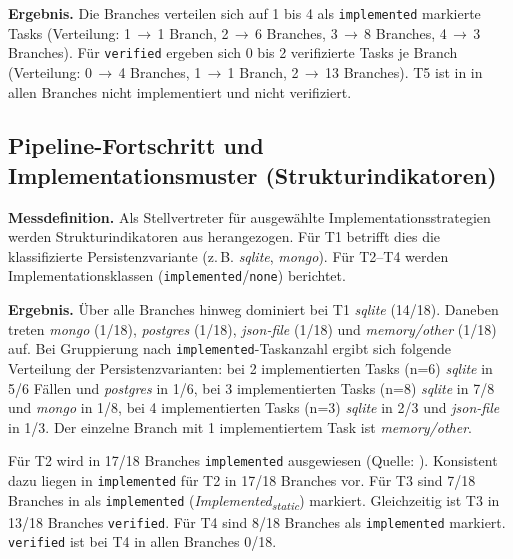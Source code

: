 {\bfseries Ergebnis.} Die Branches verteilen sich auf 1 bis 4 als \texttt{implemented} markierte Tasks (Verteilung: 1\,$\rightarrow$\,1 Branch, 2\,$\rightarrow$\,6 Branches, 3\,$\rightarrow$\,8 Branches, 4\,$\rightarrow$\,3 Branches).
Für \texttt{verified} ergeben sich 0 bis 2 verifizierte Tasks je Branch (Verteilung: 0\,$\rightarrow$\,4 Branches, 1\,$\rightarrow$\,1 Branch, 2\,$\rightarrow$\,13 Branches).
T5 ist in  in allen Branches nicht implementiert und nicht verifiziert.

\subsection{Pipeline-Fortschritt und Implementationsmuster (Strukturindikatoren)}
\label{sec:results_triangulation_strategies}

\begin{sloppypar}
{\bfseries Messdefinition.} Als Stellvertreter für ausgewählte Implementationsstrategien werden Strukturindikatoren aus  herangezogen.
Für T1 betrifft dies die klassifizierte Persistenzvariante (z.\,B. \emph{sqlite}, \emph{mongo}). Für T2--T4 werden Implementationsklassen (\texttt{implemented}/\texttt{none}) berichtet.
\end{sloppypar}

{\bfseries Ergebnis.} Über alle Branches hinweg dominiert bei T1 \emph{sqlite} (14/18). Daneben treten \emph{mongo} (1/18), \emph{postgres} (1/18), \emph{json-file} (1/18) und \emph{memory/other} (1/18) auf.
Bei Gruppierung nach \texttt{implemented}-Taskanzahl ergibt sich folgende Verteilung der Persistenzvarianten: bei 2 implementierten Tasks (n=6) \emph{sqlite} in 5/6 Fällen und \emph{postgres} in 1/6, bei 3 implementierten Tasks (n=8) \emph{sqlite} in 7/8 und \emph{mongo} in 1/8, bei 4 implementierten Tasks (n=3) \emph{sqlite} in 2/3 und \emph{json-file} in 1/3. Der einzelne Branch mit 1 implementiertem Task ist \emph{memory/other}.

\begin{sloppypar}
Für T2 wird in 17/18 Branches \texttt{implemented} ausgewiesen (Quelle: ). Konsistent dazu liegen in  \texttt{implemented} für T2 in 17/18 Branches vor.
Für T3 sind 7/18 Branches in  als \texttt{implemented} (\textit{Implemented\textsubscript{static}}) markiert. Gleichzeitig ist T3 in 13/18 Branches \texttt{verified}.
Für T4 sind 8/18 Branches als \texttt{implemented} markiert. \texttt{verified} ist bei T4 in allen Branches 0/18.
\end{sloppypar}

